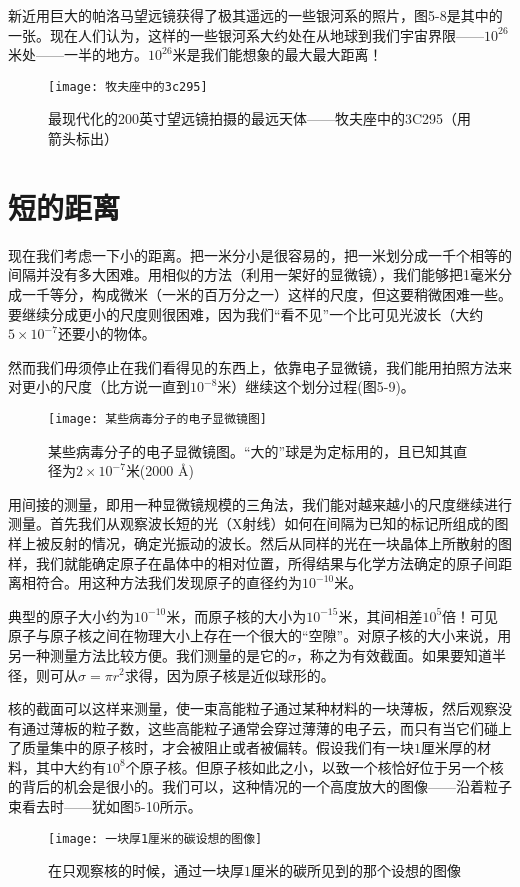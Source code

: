 \documentclass[11pt,oneside]{book}
\begin{document}
\begin{common-format}
新近用巨大的帕洛马望远镜获得了极其遥远的一些银河系的照片，图5-8是其中的一张。现在人们认为，这样的一些银河系大约处在从地球到我们宇宙界限——$ 10^{26} $米处——一半的地方。$ 10^{26} $米是我们能想象的最大最大距离！
\begin{figure}[H]
\centering
\texttt{[image: 牧夫座中的3c295]}
\caption{\footnotesize 最现代化的200英寸望远镜拍摄的最远天体——牧夫座中的3C295（用箭头标出）}
\end{figure}


\section{短的距离}
现在我们考虑一下小的距离。把一米分小是很容易的，把一米划分成一千个相等的间隔并没有多大困难。用相似的方法（利用一架好的显微镜），我们能够把1毫米分成一千等分，构成微米（一米的百万分之一）这样的尺度，但这要稍微困难一些。要继续分成更小的尺度则很困难，因为我们“看不见”一个比可见光波长（大约$ 5\times 10^{-7} $还要小的物体。

然而我们毋须停止在我们看得见的东西上，依靠电子显微镜，我们能用拍照方法来对更小的尺度（比方说一直到$ 10^{-8} $米）继续这个划分过程(图5-9)。
\begin{figure}[H]
\centering
\texttt{[image: 某些病毒分子的电子显微镜图]}
\caption{\footnotesize 某些病毒分子的电子显微镜图。“大的”球是为定标用的，且已知其直径为$ 2\times 10^{-7} $米(2000 Å)}
\end{figure}
用间接的测量，即用一种显微镜规模的三角法，我们能对越来越小的尺度继续进行测量。首先我们从观察波长短的光（X射线）如何在间隔为已知的标记所组成的图样上被反射的情况，确定光振动的波长。然后从同样的光在一块晶体上所散射的图样，我们就能确定原子在晶体中的相对位置，所得结果与化学方法确定的原子间距离相符合。用这种方法我们发现原子的直径约为$10^{-10}$米。

典型的原子大小约为$10^{-10}$米，而原子核的大小为$10^{-15}$米，其间相差$10^5$倍！可见原子与原子核之间在物理大小上存在一个很大的“空隙”。对原子核的大小来说，用另一种测量方法比较方便。我们测量的是它的$\sigma$，称之为有效截面。如果要知道半径，则可从$\sigma=\pi r^2$求得，因为原子核是近似球形的。

核的截面可以这样来测量，使一束高能粒子通过某种材料的一块薄板，然后观察没有通过薄板的粒子数，这些高能粒子通常会穿过薄薄的电子云，而只有当它们碰上了质量集中的原子核时，才会被阻止或者被偏转。假设我们有一块$1$厘米厚的材料，其中大约有$10^8$个原子核。但原子核如此之小，以致一个核恰好位于另一个核的背后的机会是很小的。我们可以，这种情况的一个高度放大的图像——沿着粒子束看去时——犹如图5-10所示。
\begin{figure}[H]
\centering
\texttt{[image: 一块厚1厘米的碳设想的图像]}
\caption{\footnotesize 在只观察核的时候，通过一块厚$1$厘米的碳所见到的那个设想的图像}
\end{figure}


\end{common-format}
\end{document}
